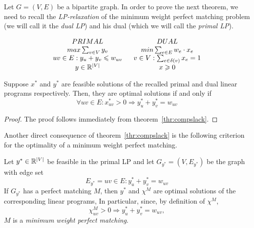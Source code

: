 Let $G=(V,E)$ be a bipartite graph.
In order to prove the next theorem, we need to recall the 
\emph{LP-relaxation} of the minimum weight perfect matching 
problem (we will call it the \emph{dual LP}) and his dual (which 
we will call the \emph{primal LP}).

\begin{displaymath}
   \begin{array}{c c}
   PRIMAL                & DUAL \\
   max \sum_{v \in V} y_v & min \sum_{e \in E} w_e \cdot x_e \\
   \ uv \in E: y_u+y_v \leqslant w_{uv}  \ &
   \ v \in V: \sum_{e \in \delta(v)} x_e = 1 \ \\
   y \in \mathbb{R}^{|V|}     & x \geqslant 0
   \end{array}
\end{displaymath}

\begin{theorem}
\label{thr:optmat}
   Suppose $x^*$ and $y^*$ are feasible solutions of the recalled 
   primal and dual linear programs respectively. 
   Then, they are optimal solutions if and only if
   \begin{displaymath}
      \forall uv \in E: 
      x^*_{uv} > 0 \Rightarrow y^*_u + y^*_v = w_{uv}
   \end{displaymath}
\end{theorem}

\begin{proof}
   The proof follows immediately from theorem~\ref{thr:compslack}.
\end{proof}

Another direct consequence of theorem~\ref{thr:compslack} is 
the following criterion for the optimality of a minimum
weight perfect matching.

Let $y^* \in \mathbb{R}^{|V|}$ be feasible in the primal LP and 
let $G_{y^*}=(V,E_{y^*})$ be the graph with edge set
\begin{displaymath}
   E_{y^*} = {uv \in E: y^*_u + y^*_v = w_{uv}}
\end{displaymath}
If $G_{y^*}$ has a perfect matching $M$, then $y^*$ and $\chi^M$ 
are optimal solutions of the corresponding linear programs,
In particular, since, by definition of $\chi^M$,
\begin{displaymath}
   \chi^M_{uv} > 0 \Rightarrow y^*_u + y^*_v = w_{uv},
\end{displaymath} 
$M$ is a \emph{minimum weight perfect matching}.

